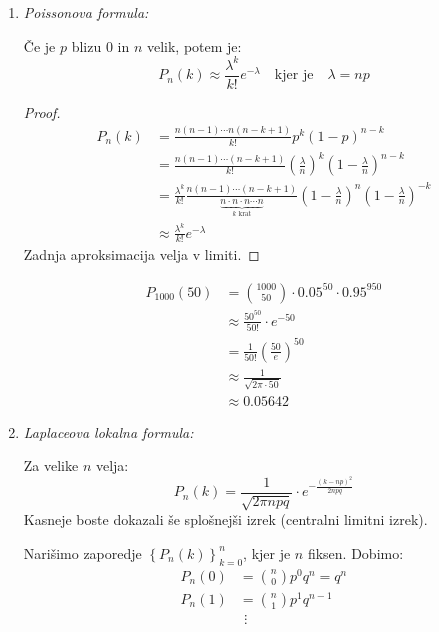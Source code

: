 \documentclass[12pt]{book}
\theoremstyle{definition}
\theoremstyle{plain}
\theoremstyle{plain}
\theoremstyle{plain}
\theoremstyle{remark}
\begin{document}
\begin{enumerate}[label=(\alph*)]
    \item \emph{Poissonova formula:}
    
    Če je $p$ blizu $0$ in $n$ velik, potem je: 
    $$
    P_n(k) \approx \frac{\lambda^k}{k !} e^{-\lambda} \quad \text{kjer je} \quad \lambda = n p
    $$
    \begin{proof}
        $$
        \begin{aligned}
            P_n(k)&=\frac{n(n-1) \cdots n(n-k+1)}{k !} p^k (1-p)^{n-k} \\
            &=\frac{n(n-1) \cdots(n-k+1)}{k !}\left(\frac{\lambda}{n}\right)^k \left(1-\frac{\lambda}{n}\right)^{n-k} \\
            &=\frac{\lambda^k}{k !} \frac{n(n-1)\cdots(n-k+1)}{\underbrace{n \cdot n \cdot n \cdots n}_{k \text{ krat}}} \left(1-\frac{\lambda}{n}\right)^n \left(1-\frac{\lambda}{n}\right)^{-k} \\
            &\approx \frac{\lambda^k}{k !} e^{-\lambda}
        \end{aligned}
        $$
        Zadnja aproksimacija velja v limiti. 
    \end{proof}
    \begin{zgled}
        $$
        \begin{aligned}
            P_{1000}(50) &= \binom{1000}{50}\cdot 0.05^{50} \cdot 0.95^{950} \\
            &\approx \frac{50^{50}}{50 !} \cdot e^{-50} \\
            &= \frac{1}{50 !}\left(\frac{50}{e}\right)^{50} \\
            &\approx \frac{1}{\sqrt{2 \pi \cdot 50}} \\
            &\approx 0.05642
        \end{aligned}
        $$
    \end{zgled}
    \item \emph{Laplaceova lokalna formula:}
    
    Za velike $n$ velja: 
    $$
    P_n(k) = \frac{1}{\sqrt{2 \pi n  p q}} \cdot e^{-\frac{\left(k-np\right)^2}{2 n p q}}
    $$
    Kasneje boste dokazali še splošnejši izrek (centralni limitni izrek).

    Narišimo zaporedje $\left\{P_n(k)\right\}_{k=0}^n$, kjer je $n$ fiksen. Dobimo: 
    $$
    \begin{aligned}
        P_n(0)&=\binom{n}{0} p^0 q^n=q^n \\
        P_n(1)&=\binom{n}{1} p^1 q^{n-1} \\
        & \ \, \vdots
    \end{aligned}
    $$
    

\end{enumerate}
\end{document}
